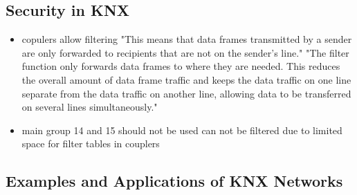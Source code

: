 	\subsection{Security in KNX}
	\begin{itemize}
		\item copulers allow filtering 
			\subitem "This means that data frames transmitted by a sender are only forwarded to recipients that are not on the sender’s line." \parencite{Merz2009}
			\subitem "The filter function only forwards data frames to where they are needed. This reduces the overall amount of data frame traffic and keeps the data traffic on one line separate from the data traffic on another line, allowing data to be transferred on several lines simultaneously." \parencite{Merz2009}
		\item main group 14 and 15 should not be used \parencite{Hubner2009}
			\subitem can not be filtered due to limited space for filter tables in couplers \parencite{Hubner2009}
			
			
	\end{itemize}
	
	\subsection{Examples and Applications of KNX Networks}

\section{\lonworks}

\section{\bacnet}